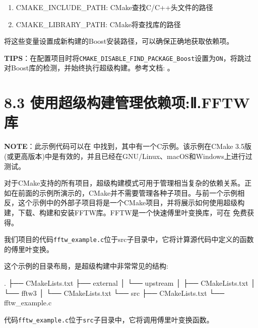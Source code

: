 \begin{enumerate}
\item CMAKE\_INCLUDE\_PATH: CMake查找C/C++头文件的路径

\item CMAKE\_LIBRARY\_PATH: CMake将查找库的路径

\end{enumerate}

将这些变量设置成新构建的Boost安装路径，可以确保正确地获取依赖项。

\begin{myInfoBox}
\textbf{TIPS}：在配置项目时将\texttt{CMAKE\_DISABLE\_FIND\_PACKAGE\_Boost}设置为\texttt{ON}，将跳过对Boost库的检测，并始终执行超级构建。参考文档: 。
\end{myInfoBox}


\section{8.3 使用超级构建管理依赖项:Ⅱ.FFTW库}

\begin{myInfoBox}
\textbf{NOTE}：此示例代码可以在  中找到，其中有一个C示例。该示例在CMake 3.5版(或更高版本)中是有效的，并且已经在GNU/Linux、macOS和Windows上进行过测试。
\end{myInfoBox}

对于CMake支持的所有项目，超级构建模式可用于管理相当复杂的依赖关系。正如在前面的示例所演示的，CMake并不需要管理各种子项目。与前一个示例相反，这个示例中的外部子项目将是一个CMake项目，并将展示如何使用超级构建，下载、构建和安装FFTW库。FFTW是一个快速傅里叶变换库，可在 免费获得。

我们项目的代码\texttt{fftw\_example.c}位于src子目录中，它将计算源代码中定义的函数的傅里叶变换。


这个示例的目录布局，是超级构建中非常常见的结构:

\begin{codebox}[shell]
.
├── CMakeLists.txt
├── external
│    └── upstream
│        ├── CMakeLists.txt
│        └── fftw3
│            └── CMakeLists.txt
└── src
    ├── CMakeLists.txt
    └── fftw_example.c
\end{codebox}

代码\texttt{fftw\_example.c}位于\texttt{src}子目录中，它将调用傅里叶变换函数。

